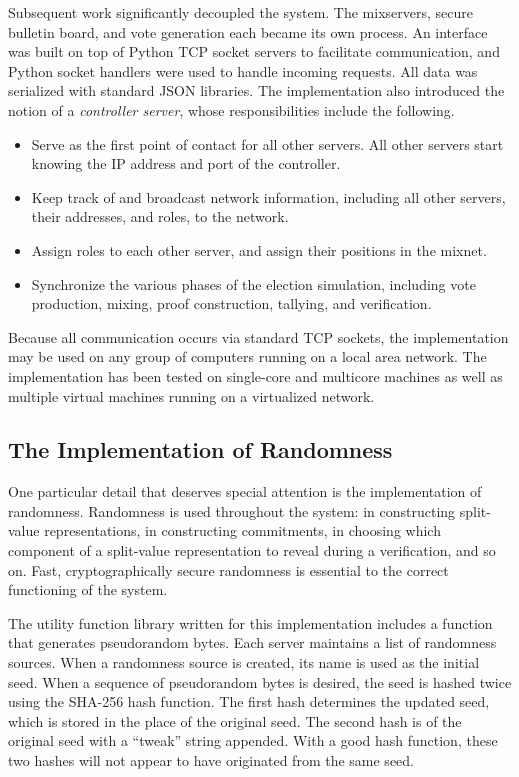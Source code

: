Subsequent work \cite{marco} significantly decoupled the system. The mixservers, secure bulletin board, and vote generation each became its own process. An interface was built on top of Python TCP socket servers to facilitate communication, and Python socket handlers were used to handle incoming requests. All data was serialized with standard JSON libraries. The implementation also introduced the notion of a \emph{controller server}, whose responsibilities include the following.
\begin{itemize}
\item Serve as the first point of contact for all other servers. All other servers start knowing the IP address and port of the controller.
\item Keep track of and broadcast network information, including all other servers, their addresses, and roles, to the network.
\item Assign roles to each other server, and assign their positions in the mixnet.
\item Synchronize the various phases of the election simulation, including vote production, mixing, proof construction, tallying, and verification.
\end{itemize}

Because all communication occurs via standard TCP sockets, the implementation may be used on any group of computers running on a local area network. The implementation has been tested on single-core and multicore machines as well as multiple virtual machines running on a virtualized network.

\subsection{The Implementation of Randomness} \label{sv:implementation:random}

One particular detail that deserves special attention is the implementation of randomness. Randomness is used throughout the system: in constructing split-value representations, in constructing commitments, in choosing which component of a split-value representation to reveal during a verification, and so on. Fast, cryptographically secure randomness is essential to the correct functioning of the system.

The utility function library written for this implementation includes a function that generates pseudorandom bytes. Each server maintains a list of randomness sources. When a randomness source is created, its name is used as the initial seed. When a sequence of pseudorandom bytes is desired, the seed is hashed twice using the SHA-256 hash function. The first hash determines the updated seed, which is stored in the place of the original seed. The second hash is of the original seed with a ``tweak'' string appended. With a good hash function, these two hashes will not appear to have originated from the same seed.

